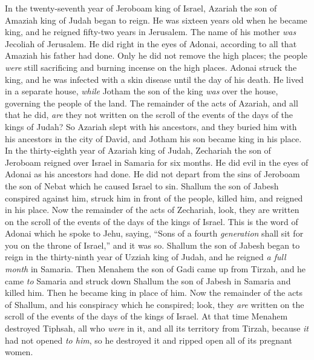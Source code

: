\begin{biblechapter} %
 In the twenty-seventh year of Jeroboam king of Israel, Azariah the son of Amaziah king of Judah began to reign.
\verse He was sixteen years old when he became king, and he reigned fifty-two years in Jerusalem. The name of his mother \textit{was} Jecoliah of Jerusalem.
\verse He did right in the eyes of Adonai, according to all that Amaziah his father had done.
\verse Only he did not remove the high places; the people \textit{were} still sacrificing and burning incense on the high places.
\verse Adonai struck the king, and he was infected with a skin disease until the day of his death. He lived in a separate house, \textit{while} Jotham the son of the king \textit{was} over the house, governing the people of the land.
\verse The remainder of the acts of Azariah, and all that he did, \textit{are} they not written on the scroll of the events of the days of the kings of Judah?
\verse So Azariah slept with his ancestors, and they buried him with his ancestors in the city of David, and Jotham his son became king in his place.
 In the thirty-eighth year of Azariah king of Judah, Zechariah the son of Jeroboam reigned over Israel in Samaria for six months.
\verse He did evil in the eyes of Adonai as his ancestors had done. He did not depart from the sins of Jeroboam the son of Nebat which he caused Israel to sin.
\verse Shallum the son of Jabesh conspired against him, struck him in front of the people, killed him, and reigned in his place.
\verse Now the remainder of the acts of Zechariah, look, they are written on the scroll of the events of the days of the kings of Israel.
\verse This is the word of Adonai which he spoke to Jehu, saying, “Sons of a fourth \textit{generation} shall sit for you on the throne of Israel,” and it was so.
 Shallum the son of Jabesh began to reign in the thirty-ninth year of Uzziah king of Judah, and he reigned \textit{a full month} in Samaria.
\verse Then Menahem the son of Gadi came up from Tirzah, and he came \textit{to} Samaria and struck down Shallum the son of Jabesh in Samaria and killed him. Then he became king in place of him.
\verse Now the remainder of the acts of Shallum, and his conspiracy which he conspired; look, they \textit{are} written on the scroll of the events of the days of the kings of Israel.
\verse At that time Menahem destroyed Tiphsah, all who \textit{were} in it, and all its territory from Tirzah, because \textit{it} had not opened \textit{to him}, so he destroyed it and ripped open all of its pregnant women.

\end{biblechapter}
